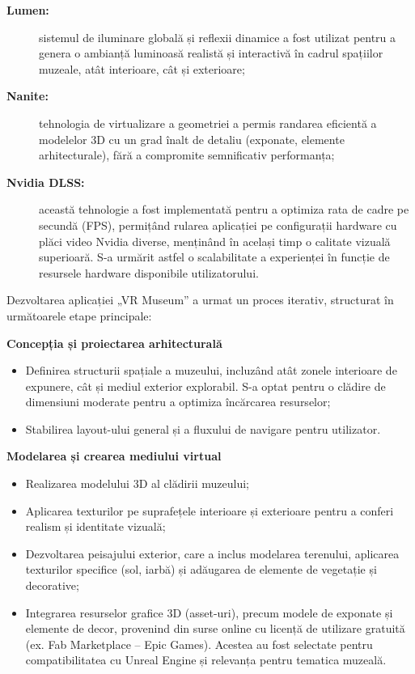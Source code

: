 \begin{adjustwidth}{2em}{0pt}
\begin{description}
\item[\textbf{Lumen:}] sistemul de iluminare globală și reflexii dinamice a fost utilizat pentru a genera o ambianță luminoasă realistă și interactivă în cadrul spațiilor muzeale, atât interioare, cât și exterioare; 
    
\item[\textbf{Nanite: }] tehnologia de virtualizare a geometriei a permis randarea eficientă a modelelor 3D cu un grad înalt de detaliu (exponate, elemente arhitecturale), fără a compromite semnificativ performanța; 

\item[\textbf{Nvidia DLSS: }] această tehnologie a fost implementată pentru a optimiza rata de cadre pe secundă (FPS), permițând rularea aplicației pe configurații hardware cu plăci video Nvidia diverse, menținând în același timp o calitate vizuală superioară. S-a urmărit astfel o scalabilitate a experienței în funcție de resursele hardware disponibile utilizatorului.
\end{description}
\end{adjustwidth}


\noindent Dezvoltarea aplicației „VR Museum” a urmat un proces iterativ, structurat în următoarele etape principale:

\noindent \textbf{Concepția și proiectarea arhitecturală}

\begin{itemize}
  \item Definirea structurii spațiale a muzeului, incluzând atât zonele interioare de expunere, cât și mediul exterior explorabil. S-a optat pentru o clădire de dimensiuni moderate pentru a optimiza încărcarea resurselor;
  \item Stabilirea layout-ului general și a fluxului de navigare pentru utilizator.
\end{itemize}

\noindent \textbf{Modelarea și crearea mediului virtual}

\begin{itemize}
  \item Realizarea modelului 3D al clădirii muzeului;
  \item Aplicarea texturilor pe suprafețele interioare și exterioare pentru a conferi realism și identitate vizuală;
  \item Dezvoltarea peisajului exterior, care a inclus modelarea terenului, aplicarea texturilor specifice (sol, iarbă) și adăugarea de elemente de vegetație și decorative;
  \item Integrarea resurselor grafice 3D (asset-uri), precum modele de exponate și elemente de decor, provenind din surse online cu licență de utilizare gratuită (ex. Fab Marketplace – Epic Games). Acestea au fost selectate pentru compatibilitatea cu Unreal Engine și relevanța pentru tematica muzeală.
\end{itemize}

